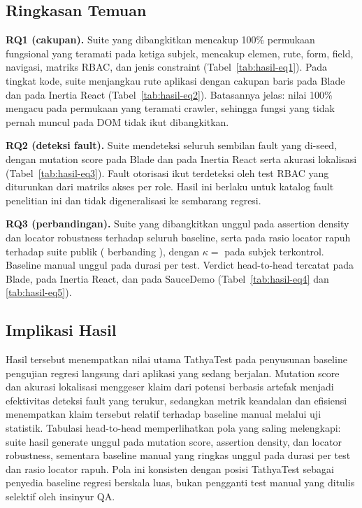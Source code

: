 \documentclass[conference]{IEEEtran}
\begin{document}
\subsection{Ringkasan Temuan}

\textbf{RQ1 (cakupan).} Suite yang dibangkitkan mencakup 100\% permukaan fungsional yang teramati pada ketiga subjek, mencakup elemen, rute, form, field, navigasi, matriks RBAC, dan jenis constraint (Tabel~\ref{tab:hasil-eq1}). Pada tingkat kode, suite menjangkau \evBladeRouteExecCov{} rute aplikasi dengan cakupan baris \evBladeLineCov{} pada Blade dan \evInertiaLineCov{} pada Inertia React (Tabel~\ref{tab:hasil-eq2}). Batasannya jelas: nilai 100\% mengacu pada permukaan yang teramati crawler, sehingga fungsi yang tidak pernah muncul pada DOM tidak ikut dibangkitkan.

\textbf{RQ2 (deteksi fault).} Suite mendeteksi seluruh sembilan fault yang di-seed, dengan mutation score \evBladeMutScore{} pada Blade dan \evInertiaMutScore{} pada Inertia React serta akurasi lokalisasi \evBladeFaultLoc{} (Tabel~\ref{tab:hasil-eq3}). Fault otorisasi ikut terdeteksi oleh test RBAC yang diturunkan dari matriks akses per role. Hasil ini berlaku untuk katalog fault penelitian ini dan tidak digeneralisasi ke sembarang regresi.

\textbf{RQ3 (perbandingan).} Suite yang dibangkitkan unggul pada assertion density dan locator robustness terhadap seluruh baseline, serta pada rasio locator rapuh terhadap suite publik (\evSauceBrittle{} berbanding \evSauceBaseBrittle), dengan $\kappa=$ \evBladeKappa{} pada subjek terkontrol. Baseline manual unggul pada durasi per test. Verdict head-to-head tercatat \evBladeVerdict{} pada Blade, \evInertiaVerdict{} pada Inertia React, dan \evSauceVerdict{} pada SauceDemo (Tabel~\ref{tab:hasil-eq4} dan \ref{tab:hasil-eq5}).

\subsection{Implikasi Hasil}

Hasil tersebut menempatkan nilai utama TathyaTest pada penyusunan baseline pengujian regresi langsung dari aplikasi yang sedang berjalan. Mutation score dan akurasi lokalisasi menggeser klaim dari potensi berbasis artefak menjadi efektivitas deteksi fault yang terukur, sedangkan metrik keandalan dan efisiensi menempatkan klaim tersebut relatif terhadap baseline manual melalui uji statistik. Tabulasi head-to-head memperlihatkan pola yang saling melengkapi: suite hasil generate unggul pada mutation score, assertion density, dan locator robustness, sementara baseline manual yang ringkas unggul pada durasi per test dan rasio locator rapuh. Pola ini konsisten dengan posisi TathyaTest sebagai penyedia baseline regresi berskala luas, bukan pengganti test manual yang ditulis selektif oleh insinyur QA.
\end{document}
